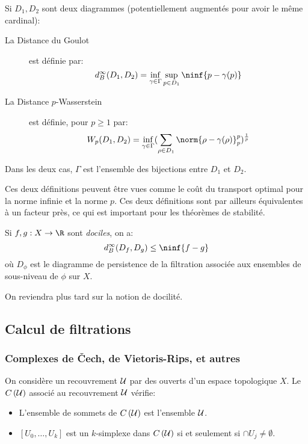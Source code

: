 \begin{definition}
	Si $D_{1}, D_{2}$ sont deux diagrammes (potentiellement augmentés pour avoir le même cardinal):
	\begin{description}
		\item[La Distance du Goulot] est définie par:
		      \begin{equation*}
			      d_{B}^{\infty}(D_{1}, D_{2}) = \inf_{\gamma \in \Gamma} \sup_{p \in D_{1}} \ninf{p - \gamma(p)}
		      \end{equation*}
		\item[La Distance $p$-Wasserstein] est définie, pour $p \geq 1$ par:
		      \begin{equation*}
			      W_{p}(D_{1}, D_{2}) = \inf_{\gamma \in \Gamma} (\sum_{\rho \in D_{1}} \norm{\rho - \gamma(\rho)}_{p}^{p})^{\frac{1}{p}}
		      \end{equation*}
	\end{description}
	Dans les deux cas, $\Gamma$ est l'ensemble des bijections entre $D_{1}$ et $D_{2}$.
\end{definition}

\begin{remarque}
	Ces deux définitions peuvent être vues comme le coût du transport optimal pour la norme infinie et la norme $p$.
	Ces deux définitions sont par ailleurs équivalentes à un facteur près, ce qui est important pour les théorèmes de stabilité.
\end{remarque}

\begin{thm}
	Si $f, g : X \to \R$ sont \emph{dociles}, on a:
	\begin{equation*}
		d_{B}^{\infty}(D_{f}, D_{g}) \leq \ninf{f - g}
	\end{equation*}
	où $D_{\phi}$ est le diagramme de persistence de la filtration associée aux ensembles de sous-niveau de $\phi$ sur $X$.
\end{thm}
On reviendra plus tard sur la notion de docilité.

\subsection{Calcul de filtrations}
\subsubsection{Complexes de Čech, de Vietoris-Rips, et autres}
\begin{definition}
	On considère un recouvrement $\mathcal{U}$ par des ouverts d'un espace topologique $X$.
	Le  $C\left(\mathcal{U}\right)$ associé au recouvrement $\mathcal{U}$ vérifie:
	\begin{itemize}
		\item L'ensemble de sommets de $C\left(\mathcal{U}\right)$ est l'ensemble $\mathcal{U}$.
		\item $\left[U_{0}, \ldots, U_{k}\right]$ est un $k$-simplexe dans $C\left(\mathcal{U}\right)$ si et seulement si $\cap U_{j} \neq \emptyset$.
	\end{itemize}
\end{definition}

